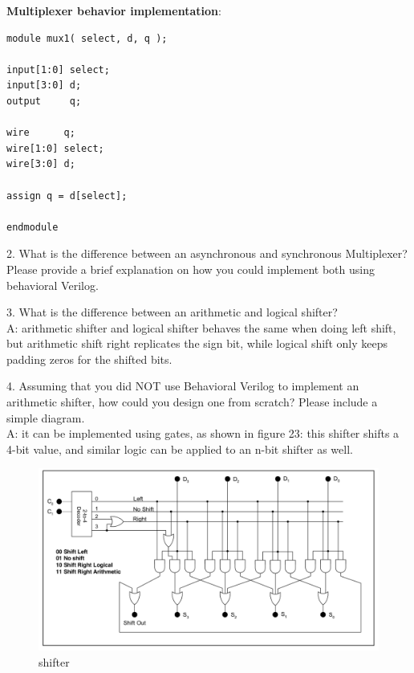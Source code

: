 \documentclass{article}
\begin{document}
\textbf{Multiplexer behavior implementation}: 
\begin{verbatim}
module mux1( select, d, q );

input[1:0] select;
input[3:0] d;
output     q;

wire      q;
wire[1:0] select;
wire[3:0] d;

assign q = d[select];

endmodule
\end{verbatim}

\vspace{10mm}
2. What is the difference between an asynchronous and synchronous Multiplexer? Please provide a brief explanation on how you could implement both using behavioral Verilog.\\
\vspace{10mm}

3. What is the difference between an arithmetic and logical shifter? \\
A: arithmetic shifter and logical shifter behaves the same when doing left shift, but arithmetic shift right replicates the sign bit, while logical shift only keeps padding zeros for the shifted bits. 
\vspace{10mm}

4. Assuming that you did NOT use Behavioral Verilog to implement an arithmetic shifter, how could you design one from scratch? Please include a simple diagram.\\
A: it can be implemented using gates, as shown in figure 23: this shifter shifts a 4-bit value, and similar logic can be applied to an n-bit shifter as well. 
\begin{figure}[!htb]
  \centering
  \includegraphics[width=\linewidth]{shifter.png}
  \caption{shifter}
  \label{fig:shift}
\end{figure}
\end{document}
